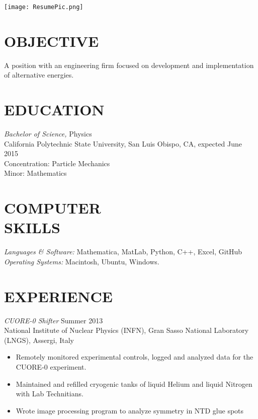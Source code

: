 \documentclass[line,margin]{res}
\begin{document}
\texttt{[image: ResumePic.png]}
\address{375 Highland Drive, San Luis Obispo, CA 93405}
\address{(530) 263-7181 or jjsekerak@gmail.com}

 
\begin{resume}
 
\section{OBJECTIVE}A position with an engineering firm focused on development and implementation of alternative energies.
 
 
\section{EDUCATION} {\sl Bachelor of Science,} Physics \\
                California Polytechnic State University, San Luis Obispo, CA, 
                expected June 2015 \\
                Concentration: Particle Mechanics \\
                Minor: Mathematics 
 
 
\section{COMPUTER \\ SKILLS} {\sl Languages \& Software:} Mathematica, MatLab, Python, C++, Excel, GitHub\\
                {\sl Operating Systems:} Macintosh, Ubuntu, Windows.
 
\section{EXPERIENCE} {
\sl CUORE-0 Shifter} \hfill Summer 2013 \\
                National Institute of Nuclear Physics (INFN), 
                Gran Sasso National Laboratory (LNGS), Assergi, Italy
                 \begin{itemize}  \itemsep -2pt %
                 \item Remotely monitored experimental controls, logged and analyzed data for the CUORE-0 experiment.
                 \item Maintained and refilled cryogenic tanks of liquid Helium and liquid Nitrogen with Lab Technitians. 
                 \item Wrote image processing program to analyze symmetry in NTD glue spots
                \end{itemize}
 

\end{resume}
\end{document}
